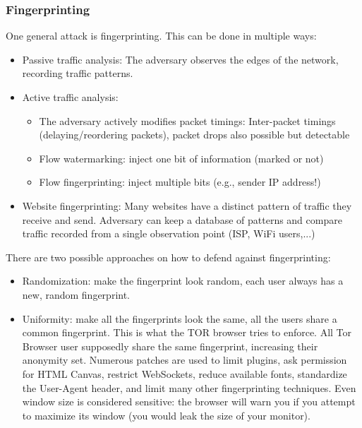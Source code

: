 \documentclass[11pt,oneside,a4paper]{article}
\begin{document}
\subsubsection{Fingerprinting}

One general attack is fingerprinting. This can be done in multiple ways:

\vspace{-\topsep}
\begin{itemize}
	\setlength{\itemsep}{0pt}
	\setlength{\parskip}{0pt}
	\item Passive traffic analysis: The adversary observes the edges of the network, recording traffic patterns.
	\item Active traffic analysis: 
	\begin{itemize}
		\item The adversary actively modifies packet timings: Inter-packet timings (delaying/reordering packets), packet drops also possible but detectable
		\item Flow watermarking: inject one bit of information (marked or not)
		\item Flow fingerprinting: inject multiple bits (e.g., sender IP address!)
	\end{itemize}
	\item Website fingerprinting: Many websites have a distinct pattern of traffic they receive and send. Adversary can keep a database of patterns and compare traffic recorded from a single observation point (ISP, WiFi users,...)
\end{itemize}
\vspace{-\topsep}

There are two possible approaches on how to defend against fingerprinting:

\vspace{-\topsep}
\begin{itemize}
	\setlength{\itemsep}{0pt}
	\setlength{\parskip}{0pt}
	\item Randomization: make the fingerprint look random, each user always has a new, random fingerprint.
	\item Uniformity: make all the fingerprints look the same, all the users share a common	fingerprint. This is what the TOR browser tries to enforce. All Tor Browser user supposedly share the same fingerprint, increasing their anonymity set. Numerous patches are used to limit plugins, ask permission for HTML Canvas, restrict WebSockets, reduce available fonts, standardize the User-Agent header, and limit many other fingerprinting techniques. Even window size is considered sensitive: the browser will warn you if you attempt to maximize its window (you would leak the size of your monitor).
\end{itemize}
\vspace{-\topsep}
\end{document}
